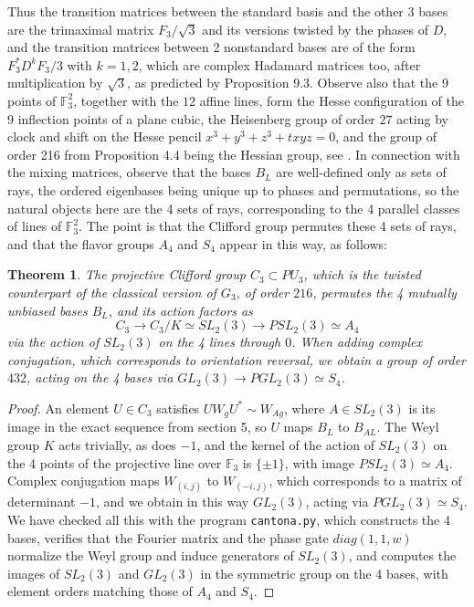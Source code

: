 \documentclass[11pt]{amsart}
\newtheorem{theorem}{Theorem}[section]
\theoremstyle{definition}
\begin{document}
Thus the transition matrices between the standard basis and the other 3 bases are the trimaximal matrix $F_3/\sqrt{3}$ and its versions twisted by the phases of $D$, and the transition matrices between 2 nonstandard bases are of the form $F_3^*D^kF_3/3$ with $k=1,2$, which are complex Hadamard matrices too, after multiplication by $\sqrt{3}$, as predicted by Proposition 9.3. Observe also that the 9 points of $\mathbb F_3^2$, together with the $12$ affine lines, form the Hesse configuration of the 9 inflection points of a plane cubic, the Heisenberg group of order $27$ acting by clock and shift on the Hesse pencil $x^3+y^3+z^3+txyz=0$, and the group of order 216 from Proposition 4.4 being the Hessian group, see \cite{ado}. In connection with the mixing matrices, observe that the bases $B_L$ are well-defined only as sets of rays, the ordered eigenbases being unique up to phases and permutations, so the natural objects here are the 4 sets of rays, corresponding to the 4 parallel classes of lines of $\mathbb F_3^2$. The point is that the Clifford group permutes these 4 sets of rays, and that the flavor groups $A_4$ and $S_4$ appear in this way, as follows:

\begin{theorem}
The projective Clifford group $C_3\subset PU_3$, which is the twisted counterpart of the classical version of $G_3$, of order $216$, permutes the 4 mutually unbiased bases $B_L$, and its action factors as
$$C_3\to C_3/K\simeq SL_2(3)\to PSL_2(3)\simeq A_4$$
via the action of $SL_2(3)$ on the 4 lines through $0$. When adding complex conjugation, which corresponds to orientation reversal, we obtain a group of order $432$, acting on the 4 bases via $GL_2(3)\to PGL_2(3)\simeq S_4$.
\end{theorem}

\begin{proof}
An element $U\in C_3$ satisfies $UW_gU^*\sim W_{Ag}$, where $A\in SL_2(3)$ is its image in the exact sequence from section 5, so $U$ maps $B_L$ to $B_{AL}$. The Weyl group $K$ acts trivially, as does $-1$, and the kernel of the action of $SL_2(3)$ on the 4 points of the projective line over $\mathbb F_3$ is $\{\pm1\}$, with image $PSL_2(3)\simeq A_4$. Complex conjugation maps $W_{(i,j)}$ to $W_{(-i,j)}$, which corresponds to a matrix of determinant $-1$, and we obtain in this way $GL_2(3)$, acting via $PGL_2(3)\simeq S_4$. We have checked all this with the program {\tt cantona.py}, which constructs the 4 bases, verifies that the Fourier matrix and the phase gate $diag(1,1,w)$ normalize the Weyl group and induce generators of $SL_2(3)$, and computes the images of $SL_2(3)$ and $GL_2(3)$ in the symmetric group on the 4 bases, with element orders matching those of $A_4$ and $S_4$.
\end{proof}
\end{document}

